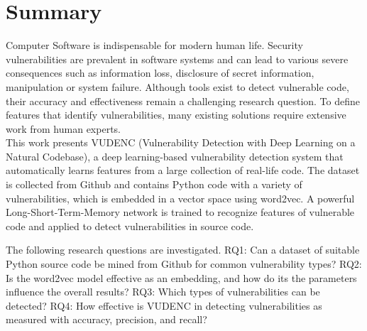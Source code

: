 \documentclass[
	a4paper,
	pagesize,
	pdftex,
	12pt,
	twoside, %
	BCOR=5mm, %
	ngerman,
	fleqn,
	final,
	]{scrartcl}
\begin{document}

\mitverteidigung %
\makeTitel
\tableofcontents
\newpage

\section{Summary}
Computer Software is indispensable for modern human life. Security vulnerabilities are prevalent in software systems and can lead to various severe consequences such as information loss, disclosure of secret information, manipulation or system failure. Although tools exist to detect vulnerable code, their accuracy and effectiveness remain a challenging research question. To define features that identify vulnerabilities, many existing solutions require extensive work from human experts.\\ %
This work presents VUDENC (Vulnerability Detection with Deep Learning on a Natural Codebase), a deep learning-based vulnerability detection system that automatically learns features from a large collection of real-life code. The dataset is collected from Github and contains Python code with a variety of vulnerabilities, which is embedded in a vector space using word2vec. A powerful Long-Short-Term-Memory network is trained to recognize features of vulnerable code and applied to detect vulnerabilities in source code. 

The following research questions are investigated. RQ1: Can a dataset of suitable Python source code be mined from Github for common vulnerability types? RQ2: Is the word2vec model effective as an embedding, and how do its the parameters influence the overall results? RQ3: Which types of vulnerabilities can be detected? RQ4: How effective is VUDENC in detecting vulnerabilities as measured with accuracy, precision, and recall? 
\end{document}
